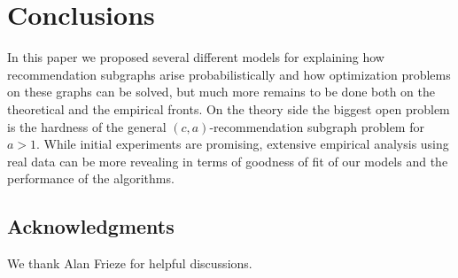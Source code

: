 \section{Conclusions}

In this paper we proposed several different models for explaining how
recommendation subgraphs arise probabilistically and how optimization
problems on these graphs can be solved, but much more remains to be done both on the theoretical and the empirical fronts. On the
theory side the biggest open problem is the hardness of the general
$(c, a)$-recommendation subgraph problem for $a > 1$. 
While initial experiments are promising, extensive empirical
analysis using real data can be more revealing in terms of goodness of fit
of our models and the performance of the algorithms.

\subsection*{Acknowledgments}
We thank Alan Frieze for helpful discussions.





